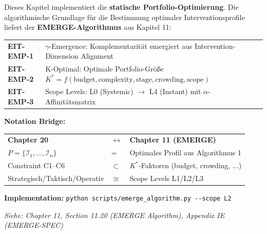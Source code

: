 \begin{tcolorbox}[colback=blue!5!white, colframe=blue!75!black,
    title=\textbf{Cross-Reference: EMERGE Algorithm (Chapter 11, EIT-EMP)}]

Dieses Kapitel implementiert die \textbf{statische Portfolio-Optimierung}. Die algorithmische Grundlage für die Bestimmung optimaler Interventionsprofile liefert der \textbf{EMERGE-Algorithmus} aus Kapitel 11:

\vspace{0.2cm}
\begin{tabular}{@{}p{3.5cm}p{9.5cm}@{}}
\textbf{EIT-EMP-1} & $\gamma$-Emergence: Komplementarität emergiert aus Intervention-Dimension Alignment \\
\textbf{EIT-EMP-2} & K-Optimal: Optimale Portfolio-Größe $K^* = f(\text{budget}, \text{complexity}, \text{stage}, \text{crowding}, \text{scope})$ \\
\textbf{EIT-EMP-3} & Scope Levels: L0 (Systemic) $\to$ L4 (Instant) mit $\alpha$-Affinitätsmatrix \\
\end{tabular}

\vspace{0.2cm}
\textbf{Notation Bridge:}
\begin{tabular}{@{}lll@{}}
\textbf{Chapter 20} & $\leftrightarrow$ & \textbf{Chapter 11 (EMERGE)} \\
$P = \{\mathcal{I}_1, ..., \mathcal{I}_n\}$ & = & Optimales Profil aus Algorithmus 1 \\
Constraint C1--C6 & $\subset$ & $K^*$-Faktoren (budget, crowding, ...) \\
Strategisch/Taktisch/Operativ & $\cong$ & Scope Levels L1/L2/L3 \\
\end{tabular}

\vspace{0.2cm}
\textbf{Implementation:} \texttt{python scripts/emerge\_algorithm.py -{}-scope L2}

\vspace{0.2cm}
\textit{Siehe: Chapter 11, Section 11.20 (EMERGE Algorithm), Appendix IE (EMERGE-SPEC)}
\end{tcolorbox}


